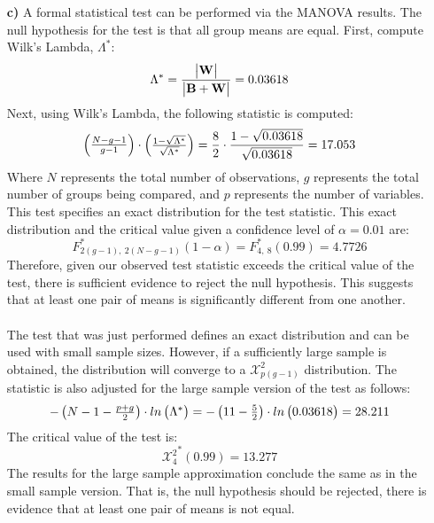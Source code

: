 \begin{enumerate}
\item[\bf{c)}] 
	A formal statistical test can be performed via the MANOVA results. The null hypothesis for the test is that all group means are equal. First, compute Wilk's Lambda, $\Lambda^*$: $$\Lambda^* = \frac{\md{\mf{W}}}{\md{\mf{B}+\mf{W}}}=0.03618$$ Next, using Wilk's Lambda, the following statistic is computed: $$\begin{pmatrix}\frac{N-g-1}{g-1}\end{pmatrix} \cdot \begin{pmatrix}\frac{1-\sqrt{\Lambda^*}}{\sqrt{\Lambda^*}}\end{pmatrix} = \frac{8}{2} \cdot \frac{1-\sqrt{0.03618}}{\sqrt{0.03618}} = 17.053$$ Where $N$ represents the total number of observations, $g$ represents the total number of groups being compared, and $p$ represents the number of variables. This test specifies an exact distribution for the test statistic. This exact distribution and the critical value given a confidence level of $\alpha = 0.01$ are: $$F_{2(g-1),\ 2(N-g-1)}^*(1-\alpha) = F_{4,\ 8}^*(0.99) =4.7726$$ Therefore, given our observed test statistic exceeds the critical value of the test, there is sufficient evidence to reject the null hypothesis. This suggests that at least one pair of means is significantly different from one another.\\
\\
The test that was just performed defines an exact distribution and can be used with small sample sizes. However, if a sufficiently large sample is obtained, the distribution will converge to a $\mathcal{X}_{p(g-1)}^2$ distribution. The statistic is also adjusted for the large sample version of the test as follows: $$-\begin{pmatrix}N - 1 - \frac{p+g}{2}\end{pmatrix} \cdot ln\begin{pmatrix}\Lambda^*\end{pmatrix} = -\begin{pmatrix}11 - \frac{5}{2}\end{pmatrix} \cdot ln\begin{pmatrix}0.03618\end{pmatrix} = 28.211$$ The critical value of the test is: $${\mathcal{X}_{4}^2}^*(0.99) = 13.277$$ The results for the large sample approximation conclude the same as in the small sample version. That is, the null hypothesis should be rejected, there is evidence that at least one pair of means is not equal.

\end{enumerate}


